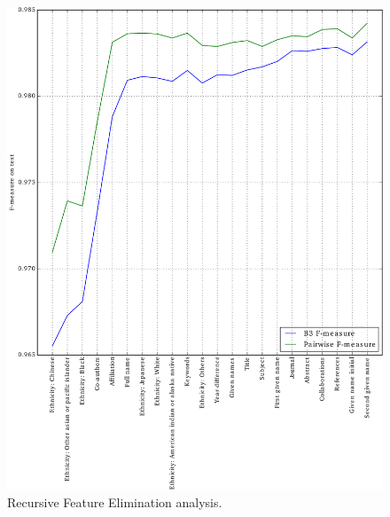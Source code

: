 \documentclass{article}
\begin{document}
\begin{figure}
\centering
\caption{Recursive Feature Elimination analysis. }
\label{fig:rfe}
\includegraphics[width=\textwidth]{fig-rfe.pdf}
\end{figure}
\end{document}
